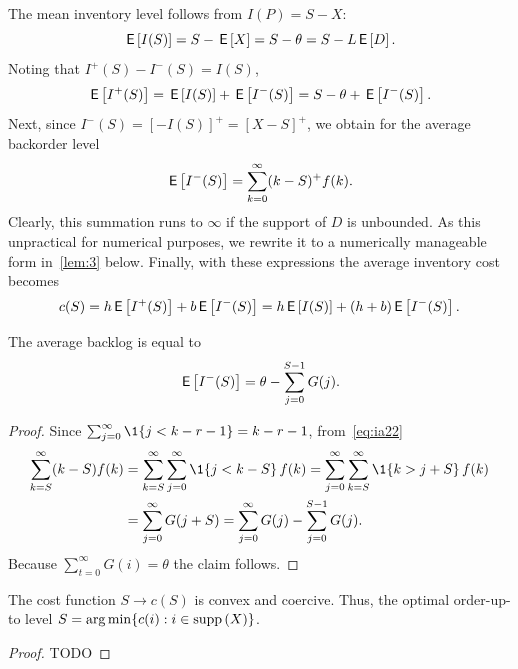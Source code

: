 \documentclass[queueing-book.tex]{subfiles}
\begin{document}
The mean inventory level follows from $I(P) = S - X$:
\begin{equation*}
\,\mathsf{E}\left[I(S)\right] = S - \,\mathsf{E}\left[X\right] = S - \theta = S - L\,\mathsf{E}\left[D\right].
\end{equation*}
Noting that $I^+(S) - I^-(S) = I(S)$,
\begin{equation*}
\,\mathsf{E}\left[I^+(S)\right] = \,\mathsf{E}\left[I(S)\right] + \,\mathsf{E}\left[I^-(S)\right] = S - \theta + \,\mathsf{E}\left[I^-(S)\right].
\end{equation*}
Next, since $I^{-}(S) = [-I(S)]^{+} = [X-S]^{+}$,  we obtain for the average backorder level
\begin{equation}\label{eq:ia22}
\,\mathsf{E}\left[I^-(S)\right] =\sum_{k=0}^\infty (k- S)^+f(k).
\end{equation}
Clearly, this summation runs to $\infty$ if the support of $D$ is unbounded.
As this unpractical for numerical purposes, we rewrite it to a numerically manageable form in~\cref{lem:3} below.
Finally, with these expressions the average inventory cost becomes
\begin{equation*}
c(S) =  h \,\mathsf{E}\left[I^{+}(S)\right] +  b \,\mathsf{E}\left[I^-(S)\right] = h \,\mathsf{E}\left[I(S)\right] +  (h+b) \,\mathsf{E}\left[I^-(S)\right].
\end{equation*}



\begin{lemma}
\label{lem:3}
The average backlog is equal to
\begin{equation*}
   \,\mathsf{E}\left[I^-(S)\right] = \theta - \sum_{j=0}^{S-1} G(j).
\end{equation*}
\end{lemma}
\begin{proof} Since $\sum_{j=0}^\infty \1{j< k-r - 1} = k-r -1$, from~\cref{eq:ia22}
\begin{align*}
   \sum_{k=S}^\infty (k-S) f(k)
   &= \sum_{k=S}^\infty\sum_{j=0}^\infty \1{j < k-S}\, f(k)   =
    \sum_{j=0}^\infty \sum_{k=S}^\infty \1{k > j +S}\, f(k)\\
   &= \sum_{j=0}^\infty  G(j+S)
   = \sum_{j=0}^\infty  G(j) - \sum_{j=0}^{S-1} G(j).
\end{align*}
Because $\sum_{t=0}^\infty G(i) = \theta$ the claim follows.
\end{proof}

\begin{theorem}
The cost function $S\to c(S)$ is convex and coercive. Thus, the optimal order-up-to level $S = \operatorname*{arg\,min}\{c(i) : i \in \mathrm{supp}\left(X\right)\}$.
\end{theorem}
\begin{proof}
TODO
\end{proof}
\end{document}
